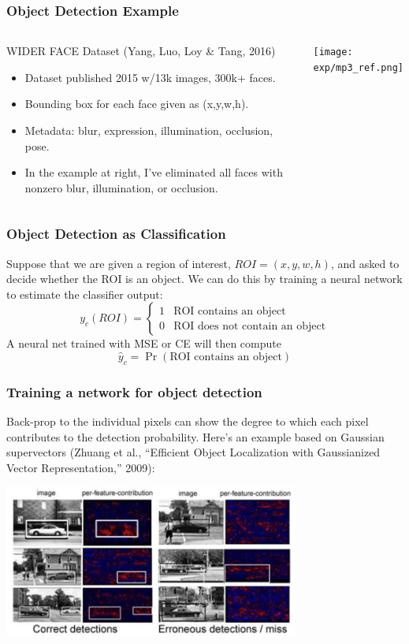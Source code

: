 \documentclass{beamer}
\begin{document}
\begin{frame}
  \frametitle{Object Detection Example}
  \begin{columns}
    \column{2in}
    \begin{block}{WIDER FACE Dataset (Yang, Luo, Loy \& Tang, 2016)}
      \begin{itemize}
      \item Dataset published 2015 w/13k images, 300k+ faces.
      \item Bounding box for each face given as (x,y,w,h).
      \item Metadata: blur, expression, illumination, occlusion, pose.
      \item In the example at right, I've eliminated all faces with
        nonzero blur, illumination, or occlusion.
      \end{itemize}
    \end{block}
    \column{2.5in}
    \begin{block}{}
      \centerline{\texttt{[image: exp/mp3\_ref.png]}}
    \end{block}
  \end{columns}
\end{frame}

\begin{frame}
  \frametitle{Object Detection as Classification}
  
  Suppose that we are given a region of interest, $ROI=(x,y,w,h)$, and
  asked to decide whether the ROI is an object.  We can do this by
  training a neural network to estimate the classifier output:
  \[
  y_c(ROI) = \begin{cases}
    1 & \mbox{ROI contains an object}\\
    0 & \mbox{ROI does not contain  an object}
  \end{cases}
  \]
  A neural net trained with MSE or CE will then compute
  \[
  \hat{y}_c=\Pr\left(\mbox{ROI contains an object}\right)
  \]
\end{frame}

\begin{frame}
  \frametitle{Training a network for object detection}
  
  Back-prop to the individual pixels can show the degree to which each
  pixel contributes to the detection probability.  Here's an example
  based on Gaussian supervectors (Zhuang et al., ``Efficient Object
  Localization with Gaussianized Vector Representation,'' 2009):
  \centerline{\includegraphics[height=2in]{figs/zhuang2009_fig4.png}}
  
\end{frame}
\end{document}
